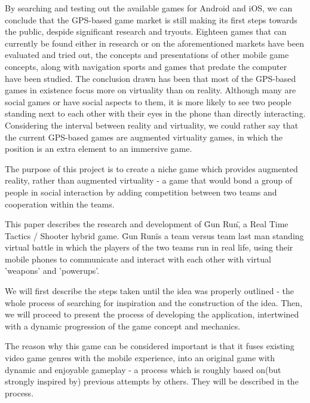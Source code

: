 \documentclass{article}
\begin{document}
By searching and testing out the available games for Android and iOS, we can
conclude that the GPS-based game market is still making its first steps towards
the public, despide significant research and tryouts. Eighteen games that can
currently be found either in research or on the aforementioned markets have been
evaluated and tried out, the concepts and presentations of other mobile game
concepts, along with navigation sports and games that predate the computer have
been studied. The conclusion drawn has been that most of the GPS-based games in
existence focus more on virtuality than on reality. Although many are social
games or have social aspects to them, it is more likely to see two people
standing next to each other with their eyes in the phone than directly
interacting. Considering the interval between reality and virtuality, we could
rather say that the current GPS-based games are augmented virtuality games, in
which the position is an extra element to an immersive game.\newline 

The purpose of this project is to create a niche game which provides augmented
reality, rather than augmented virtuality - a game that would bond a group of
people in social interaction by adding competition between two teams and
cooperation within the teams.\newline

This paper describes the research and development of \"Gun Run\", a
Real Time Tactics / Shooter hybrid game. \"Gun Run\" is a team versus team last
man standing virtual battle in which the players of the two teams run in real
life, using their mobile phones to communicate and interact with each other with
virtual 'weapons' and 'powerups'.\newline

We will first describe the steps taken until the idea was properly outlined -
the whole process of searching for inspiration and the construction of the idea.
Then, we will proceed to present the process of developing the application,
intertwined with a dynamic progression of the game concept and
mechanics.\newline

The reason why this game can be considered important is that it fuses existing
video game genres with the mobile experience, into an original game with dynamic
and enjoyable gameplay - a process which is roughly based on(but strongly
inspired by) previous attempts by others. They will be described in the
process.\newline
\end{document}
